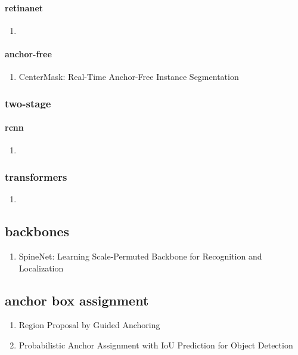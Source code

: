 \documentclass[acmlarge]{acmart}
\begin{document}
			\paragraph{retinanet}
			\begin{enumerate}
				\item
			\end{enumerate}
			\paragraph{anchor-free}
			\begin{enumerate}
				\item CenterMask: Real-Time Anchor-Free Instance Segmentation \cite{Lee2020CenterMaskRA} 

			\end{enumerate}
		\begin{enumerate}
		\end{enumerate}
		\subsubsection{two-stage}
			\paragraph{rcnn}
			\begin{enumerate}
				\item
			\end{enumerate}
		\begin{enumerate}
		\end{enumerate}
		\subsubsection{transformers}
		\begin{enumerate}
			\item
		\end{enumerate}
	\begin{enumerate}
	\end{enumerate}
	\subsection{backbones}
	\begin{enumerate}
		\item SpineNet: Learning Scale-Permuted Backbone for Recognition and Localization \cite{Du2020SpineNetLS} 

	\end{enumerate}
	\subsection{anchor box assignment}
	\begin{enumerate}
		\item Region Proposal by Guided Anchoring \cite{Wang2019RegionPB} 

		\item Probabilistic Anchor Assignment with IoU Prediction for Object Detection \cite{Kim2020ProbabilisticAA} 

	\end{enumerate}
\end{document}
